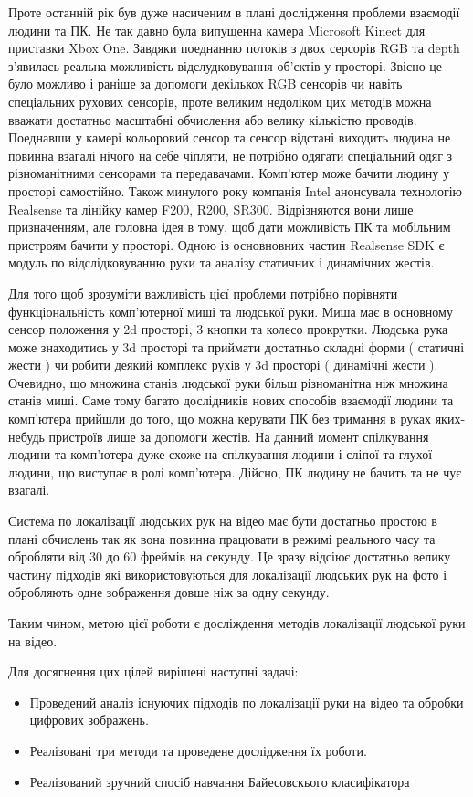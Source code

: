 Проте останній рік був дуже насиченим в плані дослідження проблеми взаємодії людини та ПК. Не так давно була випущенна камера Microsoft Kinect для приставки Xbox One. Завдяки поеднанню потоків з двох серсорів RGB та depth з'явилась реальна можливість відслудковування об'єктів у просторі. Звісно це було можливо і раніше за допомоги декількох RGB сенсорів чи навіть спеціальних рухових сенсорів, проте великим недоліком цих методів можна вважати достатньо масштабні обчислення або велику кількістю проводів. Поеднавши у камері кольоровий сенсор та сенсор відстані виходить людина не повинна взагалі нічого на себе чіпляти, не потрібно одягати спеціальний одяг з різноманітними сенсорами та передавачами. Комп'ютер може бачити людину у просторі самостійно. Також минулого року компанія Intel анонсувала технологію Realsense та лінійку камер F200, R200, SR300. Відрізняются вони лише призначенням, але головна ідея в тому, щоб дати можливість ПК та мобільним пристроям бачити у просторі. Одною із основновних частин Realsense SDK є модуль по відслідковуванню руки та аналізу статичних і динамічних жестів.

Для того щоб зрозуміти важливість цієї проблеми потрібно порівняти функціональність комп'ютерної миші та людської руки. Миша має в основному сенсор положення у 2d просторі, 3 кнопки та колесо прокрутки. Людська рука може знаходитись у 3d просторі та приймати достатньо складні форми ( статичні жести ) чи робити деякий комплекс рухів у 3d просторі ( динамічні жести ). Очевидно, що множина станів людської руки більш різноманітна ніж множина станів миші. Саме тому багато дослідників нових способів взаємодії людини та комп'ютера прийшли до того, що можна керувати ПК без тримання в руках яких-небудь пристроїв лише за допомоги жестів. На данний момент спілкування людини та комп'ютера дуже схоже на спілкування людини і сліпої та глухої людини, що виступає в ролі комп'ютера. Дійсно, ПК людину не бачить та не чує взагалі. 

Система по локалізації людських рук на відео має бути достатньо простою в плані обчислень так як вона повинна працювати в режимі реального часу та обробляти від 30 до 60 фреймів на секунду. Це зразу відсіює достатньо велику частину підходів які використовуються для локалізації людських рук на фото і обробляють одне зображення довше ніж за одну секунду.	

Таким чином, метою цієї роботи є досліждення методів локалізації людської руки на відео. 

Для досягнення цих цілей вирішені наступні задачі:
\begin{itemize}
\item Проведений аналіз існуючих підходів по локалізації руки на відео та обробки цифрових зображень.
\item Реалізовані три методи та проведене дослідження їх роботи.
\item Реалізований зручний спосіб навчання Байесовскього класифікатора
\end{itemize}

